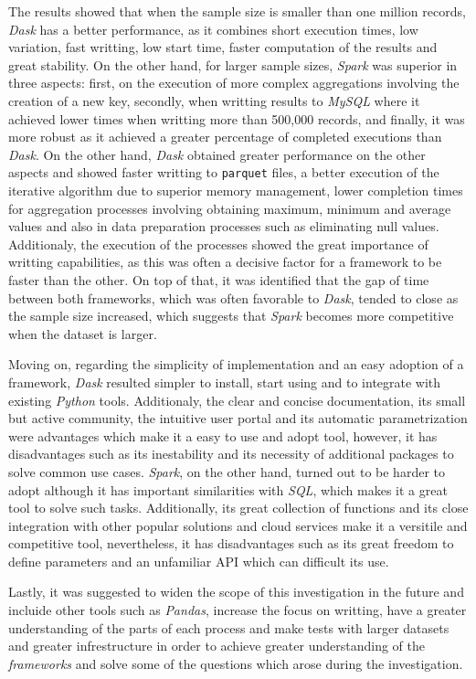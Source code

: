 \documentclass[11pt, oneside]{book}
\begin{document}
The results showed that when the sample size is smaller than one million records, \textit{Dask} has a better performance, as it combines short execution times, low variation, fast writting, low start time, faster computation of the results and great stability. On the other hand, for larger sample sizes, \textit{Spark} was superior in three aspects: first, on the execution of more complex aggregations involving the creation of a new key, secondly, when writting results to \textit{MySQL} where it achieved lower times when writting more than 500,000 records, and finally, it was more robust as it achieved a greater percentage of completed executions than \textit{Dask}. On the other hand, \textit{Dask} obtained greater performance on the other aspects and showed faster writting to \texttt{parquet} files, a better execution of the iterative algorithm due to superior memory management, lower completion times for aggregation processes involving obtaining maximum, minimum and average values and also in data preparation processes such as eliminating null values. Additionaly, the execution of the processes showed the great importance of writting capabilities, as this was often a decisive factor for a framework to be faster than the other. On top of that, it was identified that the gap of time between both frameworks, which was often favorable to \textit{Dask}, tended to close as the sample size increased, which suggests that \textit{Spark} becomes more competitive when the dataset is larger.

Moving on, regarding the simplicity of implementation and an easy adoption of a framework, \textit{Dask} resulted simpler to install, start using and to integrate with existing \textit{Python} tools. Additionaly, the clear and concise documentation, its small but active community, the intuitive user portal and its automatic parametrization were advantages which make it a easy to use and adopt tool, however, it has disadvantages such as its inestability and its necessity of additional packages to solve common use cases. \textit{Spark}, on the other hand, turned out to be harder to adopt although it has important similarities with \textit{SQL}, which makes it a great tool to solve such tasks. Additionally, its great collection of functions and its close integration with other popular solutions and cloud services make it a versitile and competitive tool, nevertheless, it has disadvantages such as its great freedom to define parameters and an unfamiliar API which can difficult its use.

Lastly, it was suggested to widen the scope of this investigation in the future and incluide other tools such as \textit{Pandas}, increase the focus on writting, have a greater understanding of the parts of each process and make tests with larger datasets and greater infrestructure in order to achieve greater understanding of the \textit{frameworks} and solve some of the questions which arose during the investigation.
\end{document}
